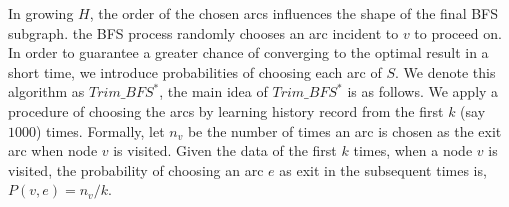 In growing $H$, the order of the chosen arcs influences the shape of the final BFS subgraph. the BFS process randomly chooses an arc incident to $v$ to proceed on. In order to guarantee a greater chance of converging to the optimal result in a short time, we introduce probabilities of choosing each arc of $S$. We denote this algorithm as \textbf{$Trim\_BFS^*$}, the main idea of $Trim\_BFS^*$ is as follows.
We apply {\color{blue}a procedure of choosing the arcs by learning history record from} the first $k$ (say $1000$) times. Formally, let $n_v$ be the number of times an arc is chosen as the exit arc when node $v$ is visited. Given the data of the first $k$ times, when a node $v$ is visited, the probability of choosing an arc $e$ as exit in the subsequent times is, $P(v, e) = n_v/k$.



